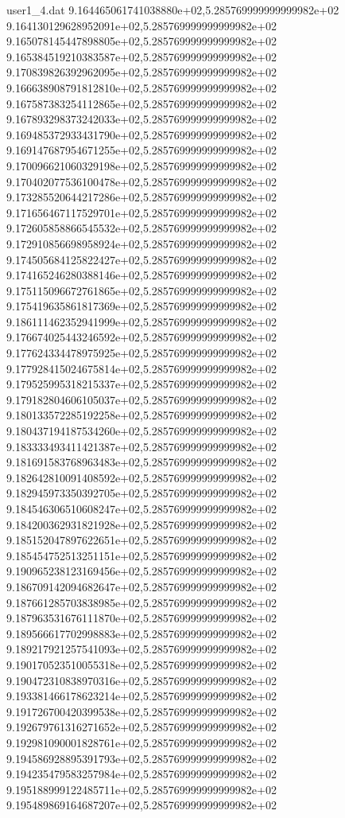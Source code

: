 \begin{filecontents}{user1_4.dat}
9.164465061741038880e+02,5.285769999999999982e+02
9.164130129628952091e+02,5.285769999999999982e+02
9.165078145447898805e+02,5.285769999999999982e+02
9.165384519210383587e+02,5.285769999999999982e+02
9.170839826392962095e+02,5.285769999999999982e+02
9.166638908791812810e+02,5.285769999999999982e+02
9.167587383254112865e+02,5.285769999999999982e+02
9.167893298373242033e+02,5.285769999999999982e+02
9.169485372933431790e+02,5.285769999999999982e+02
9.169147687954671255e+02,5.285769999999999982e+02
9.170096621060329198e+02,5.285769999999999982e+02
9.170402077536100478e+02,5.285769999999999982e+02
9.173285520644217286e+02,5.285769999999999982e+02
9.171656467117529701e+02,5.285769999999999982e+02
9.172605858866545532e+02,5.285769999999999982e+02
9.172910856698958924e+02,5.285769999999999982e+02
9.174505684125822427e+02,5.285769999999999982e+02
9.174165246280388146e+02,5.285769999999999982e+02
9.175115096672761865e+02,5.285769999999999982e+02
9.175419635861817369e+02,5.285769999999999982e+02
9.186111462352941999e+02,5.285769999999999982e+02
9.176674025443246592e+02,5.285769999999999982e+02
9.177624334478975925e+02,5.285769999999999982e+02
9.177928415024675814e+02,5.285769999999999982e+02
9.179525995318215337e+02,5.285769999999999982e+02
9.179182804606105037e+02,5.285769999999999982e+02
9.180133572285192258e+02,5.285769999999999982e+02
9.180437194187534260e+02,5.285769999999999982e+02
9.183333493411421387e+02,5.285769999999999982e+02
9.181691583768963483e+02,5.285769999999999982e+02
9.182642810091408592e+02,5.285769999999999982e+02
9.182945973350392705e+02,5.285769999999999982e+02
9.184546306510608247e+02,5.285769999999999982e+02
9.184200362931821928e+02,5.285769999999999982e+02
9.185152047897622651e+02,5.285769999999999982e+02
9.185454752513251151e+02,5.285769999999999982e+02
9.190965238123169456e+02,5.285769999999999982e+02
9.186709142094682647e+02,5.285769999999999982e+02
9.187661285703838985e+02,5.285769999999999982e+02
9.187963531676111870e+02,5.285769999999999982e+02
9.189566617702998883e+02,5.285769999999999982e+02
9.189217921257541093e+02,5.285769999999999982e+02
9.190170523510055318e+02,5.285769999999999982e+02
9.190472310838970316e+02,5.285769999999999982e+02
9.193381466178623214e+02,5.285769999999999982e+02
9.191726700420399538e+02,5.285769999999999982e+02
9.192679761316271652e+02,5.285769999999999982e+02
9.192981090001828761e+02,5.285769999999999982e+02
9.194586928895391793e+02,5.285769999999999982e+02
9.194235479583257984e+02,5.285769999999999982e+02
9.195188999122485711e+02,5.285769999999999982e+02
9.195489869164687207e+02,5.285769999999999982e+02

\end{filecontents}
